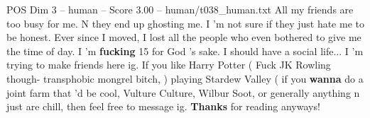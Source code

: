 \begin{textsample}{POS Dim 3 – human – Score 3.00 – human/t038\_human.txt}  \label{ex:f3_pos_007}
All my friends are too busy for me.
N they end up ghosting me.
I 'm not sure if they just hate me to be honest.
Ever since I moved, I lost all the people who even bothered to give me the time of day.
I 'm \textbf{fucking} 15 for God 's sake.
I should have a social life...
I 'm trying to make friends here ig.
If you like Harry Potter ( Fuck JK Rowling though- transphobic mongrel bitch, ) playing Stardew Valley ( if you \textbf{wanna} do a joint farm that 'd be cool, Vulture Culture, Wilbur Soot, or generally anything n just are chill, then feel free to message ig. \textbf{Thanks} for reading anyways!

\end{textsample}
